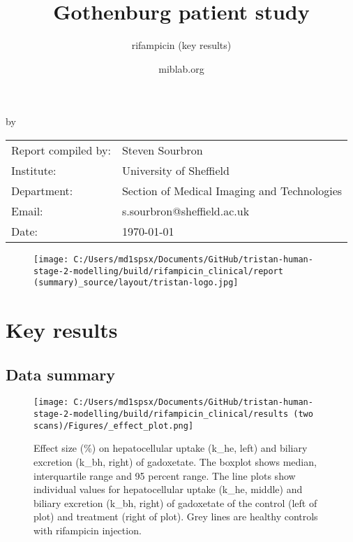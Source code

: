 \documentclass{epflreport}%
\begin{document}
%
\normalsize%
\frontmatter%
\title{Gothenburg patient study}%
\subtitle{rifampicin (key results)}%
\author{miblab.org}%
\subject{D2.13 {-} Internal report}%
%
%
%
\makecover%
\begin{titlepage}%
\begin{center}%
\makeatletter%
\largetitlestyle\fontsize{45}{45}\selectfont\@title%
\makeatother%
\linebreak%
\makeatletter%
\ifdefvoid{\@subtitle}{}{\bigskip\titlestyle\fontsize{20}{20}\selectfont\@subtitle}%
\makeatother%
\linebreak%
\bigskip%
\bigskip%
by%
\linebreak%
\bigskip%
\bigskip%
\makeatletter%
\largetitlestyle\fontsize{25}{25}\selectfont\@author%
\makeatother%
\vfill%
\large%
\begin{tabular}{ll}%
\hline%
Report compiled by: &Steven Sourbron\\%
Institute: &University of Sheffield\\%
Department: &Section of Medical Imaging and Technologies\\%
Email: &s.sourbron@sheffield.ac.uk\\%
Date: &\today\\%
\hline%
\end{tabular}%


\begin{figure}[b!]%
\centering%
\centering%
\texttt{[image: C:/Users/md1spsx/Documents/GitHub/tristan-human-stage-2-modelling/build/rifampicin\_clinical/report (summary)\_source/layout/tristan-logo.jpg]}%
\end{figure}

%
\end{center}%
\end{titlepage}%
\newpage%
\tableofcontents%
\mainmatter%
\clearpage%
\chapter{Key results}%
\section{Data summary}%
\label{sec:Datasummary}%

%


\begin{figure}[h!]%
\centering%
\texttt{[image: C:/Users/md1spsx/Documents/GitHub/tristan-human-stage-2-modelling/build/rifampicin\_clinical/results (two scans)/Figures/\_effect\_plot.png]}%
\caption{Effect size (\%) on hepatocellular uptake (k\_he, left) and biliary excretion (k\_bh, right) of gadoxetate. The boxplot shows median, interquartile range and 95 percent range. The line plots show individual values for hepatocellular uptake (k\_he, middle) and biliary excretion (k\_bh, right) of gadoxetate of the control (left of plot) and treatment (right of plot). Grey lines are healthy controls with rifampicin injection.}%
\end{figure}
\end{document}
